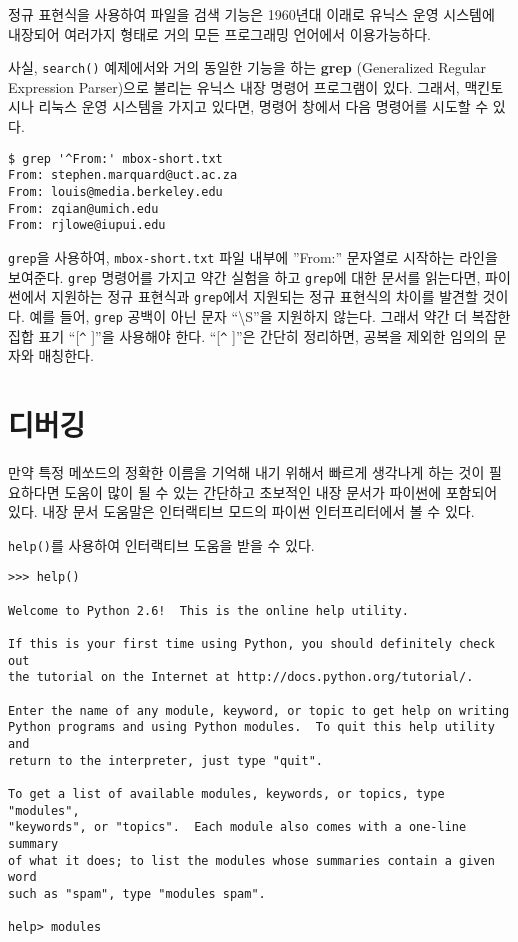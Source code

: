 정규 표현식을 사용하여 파일을 검색 기능은 1960년대 이래로 유닉스 운영 시스템에 내장되어
여러가지 형태로 거의 모든 프로그래밍 언어에서 이용가능하다.


사실, {\tt search()} 예제에서와 거의 동일한 기능을 하는 {\bf grep} (Generalized Regular Expression Parser)으로 불리는 유닉스 내장 명령어 프로그램이 있다.
그래서, 맥킨토시나 리눅스 운영 시스템을 가지고 있다면, 명령어 창에서 다음 명령어를 시도할 수 있다.

\beforeverb
\begin{verbatim}
$ grep '^From:' mbox-short.txt
From: stephen.marquard@uct.ac.za
From: louis@media.berkeley.edu
From: zqian@umich.edu
From: rjlowe@iupui.edu
\end{verbatim}
\afterverb
%

{\tt grep}을 사용하여, {\tt mbox-short.txt} 파일 내부에 ''From:'' 문자열로 시작하는 라인을 보여준다.
{\tt grep} 명령어를 가지고 약간 실험을 하고 {\tt grep}에 대한 문서를 읽는다면, 파이썬에서 지원하는 정규 표현식과 {\tt grep}에서 지원되는 정규 표현식의 
차이를 발견할 것이다.
예를 들어, {\tt grep} 공백이 아닌 문자 ``{\textbackslash}S''을 지원하지 않는다. 그래서 약간 더 복잡한 집합 표기 ``[\verb"^" ]''을 사용해야 한다.
``[\verb"^" ]''은 간단히 정리하면, 공복을 제외한 임의의 문자와 매칭한다.

\section{디버깅}

만약 특정 메쏘드의 정확한 이름을 기억해 내기 위해서 빠르게 생각나게 하는 것이 필요하다면 도움이 많이 될 수 있는 간단하고 초보적인 내장 문서가 파이썬에 포함되어 있다.
내장 문서 도움말은 인터랙티브 모드의 파이썬 인터프리터에서 볼 수 있다.

{\tt help()}를 사용하여 인터랙티브 도움을 받을 수 있다.

\beforeverb
\begin{verbatim}
>>> help()

Welcome to Python 2.6!  This is the online help utility.

If this is your first time using Python, you should definitely check out
the tutorial on the Internet at http://docs.python.org/tutorial/.

Enter the name of any module, keyword, or topic to get help on writing
Python programs and using Python modules.  To quit this help utility and
return to the interpreter, just type "quit".

To get a list of available modules, keywords, or topics, type "modules",
"keywords", or "topics".  Each module also comes with a one-line summary
of what it does; to list the modules whose summaries contain a given word
such as "spam", type "modules spam".

help> modules
\end{verbatim}
\afterverb
%

